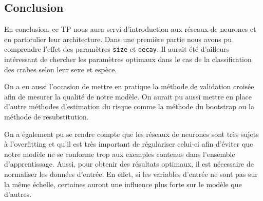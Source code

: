 \documentclass{article}
\begin{document}
\begin{multicols}{2}

\section{Conclusion}\label{sec:conclu}

En conclusion, ce TP nous aura servi d'introduction aux réseaux de neurones et
en particulier leur architecture. Dans une première partie nous avons pu
comprendre l'effet des paramètres \texttt{size} et \texttt{decay}. Il aurait été
d'ailleurs intéressant de chercher les paramètres optimaux dans le cas de la
classification des crabes selon leur sexe et espèce.

On a eu aussi l'occasion de mettre en pratique la méthode de validation croisée
afin de mesurer la qualité de notre modèle. On aurait pu aussi mettre en place
d'autre méthodes d'estimation du risque comme la méthode du bootstrap ou la
méthode de resubstitution.

On a également pu se rendre compte que les réseaux de neurones sont très sujets
à l'overfitting et qu'il est très important de régulariser celui-ci afin
d'éviter que notre modèle ne se conforme trop aux exemples contenus dans
l'ensemble d'apprentissage. Aussi, pour obtenir des résultats optimaux, il est
nécessaire de normaliser les données d'entrée. En effet, si les variables
d'entrée ne sont pas sur la même échelle, certaines auront une influence plus
forte sur le modèle que d'autres.


\end{multicols}
\end{document}
